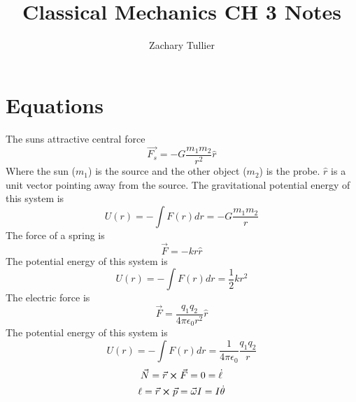 \documentclass[12pt]{article}
\begin{document}
\singlespacing  %
\title{Classical Mechanics CH 3 Notes}

\author[1]{Zachary Tullier}

\maketitle

\section{Equations}
    The suns attractive central force
    \begin{equation}
        \vec{F_s} = - G \frac{m_1 m_2}{r^2} \hat{r}
    \end{equation}
    Where the sun ($m_1$) is the source and the other object ($m_2$) is the probe. $\hat{r}$ is a unit vector pointing away from the source. 
    The gravitational potential energy of this system is
    \begin{equation}
        U(r) = - \int F(r) dr = - G \frac{m_1 m_2}{r}
    \end{equation}
    The force of a spring is 
    \begin{equation}
        \vec{F} = - k r \hat{r}
    \end{equation}
    The potential energy of this system is 
    \begin{equation}
        U(r) = - \int F(r) dr = \frac{1}{2} k r^2
    \end{equation}
    The electric force is 
    \begin{equation}
        \vec{F} = \frac{q_1 q_2}{4 \pi \epsilon_0 r^2} \hat{r}
    \end{equation}
    The potential energy of this system is
    \begin{equation}
        U(r) = - \int F(r) dr = \frac{1}{4 \pi \epsilon_0} \frac{q_1 q_2}{r}
    \end{equation}
    \begin{gather*}
        \vec{N} = \vec{r} \cross \vec{F} = 0 = \dot{\ell}
        \\ \ell = \vec{r} \cross \vec{p} = \vec{\omega} I = I \dot{\theta}
    \end{gather*}
\end{document}
